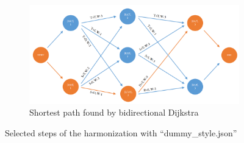 \begin{figure}[!tbp]
\begin{subfigure}[b]{1.2\linewidth}
   \hspace{-1.1cm}\includegraphics[width=\linewidth]{Chapters/pic/44}
   \hspace{-1.1cm}\caption{Shortest path found by bidirectional Dijkstra}
   \label{fig:44}
\end{subfigure}

\caption{Selected steps of the harmonization with ``dummy\_style.json''}
\label{fig:4}
\end{figure}

